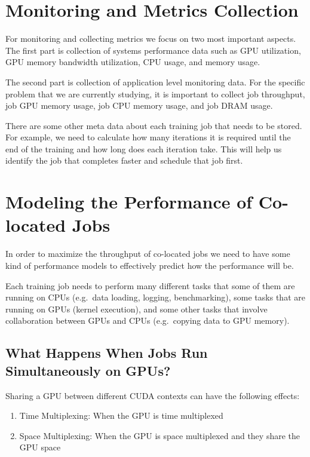 \documentclass[11pt]{article}
\begin{document}
\section{Monitoring and Metrics Collection}

For monitoring and collecting metrics we focus on two most important aspects.
The first part is collection of systems performance data such as GPU
utilization, GPU memory bandwidth utilization, CPU usage, and memory usage.

The second part is collection of application level monitoring data. For the
specific problem that we are currently studying, it is important to collect job
throughput, job GPU memory usage, job CPU memory usage, and job DRAM usage.

There are some other meta data about each training job that needs to be stored.
For example, we need to calculate how many iterations it is required until the
end of the training and how long does each iteration take. This will help us
identify the job that completes faster and schedule that job first.

\section{Modeling the Performance of Co-located Jobs}

In order to maximize the throughput of co-located jobs we need to have some kind
of performance models to effectively predict how the performance will be.

Each training job needs to perform many different tasks that some of them are
running on CPUs (e.g.\ data loading, logging, benchmarking), some tasks that
are running on GPUs (kernel execution), and some other tasks that involve
collaboration between GPUs and CPUs (e.g.\ copying data to GPU memory).

\subsection{What Happens When Jobs Run Simultaneously on GPUs?}

Sharing a GPU between different CUDA contexts can have the following effects:

\begin{enumerate}
    \item Time Multiplexing:
        When the GPU is time multiplexed
    \item Space Multiplexing:
        When the GPU is space multiplexed and they share the GPU space
\end{enumerate}
\end{document}
